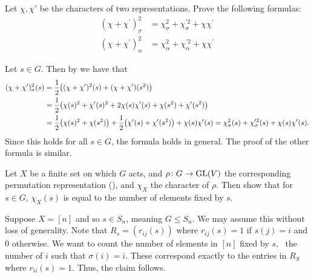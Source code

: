 \documentclass[letterpaper, 11pt, oneside]{book}
\begin{document}
\begin{exercise}
  Let $\chi, \chi'$ be the characters of two representations.
  Prove the following formulas:
  \begin{align*}
    (\chi + \chi^{\prime})^{2}_{\sigma} &= \chi_{\sigma}^{2} + \chi_{\sigma}^{\prime 2} + \chi \chi^{\prime} \\
    (\chi + \chi^{\prime})^{2}_{\alpha} &= \chi_{\alpha}^{2} + \chi_{\alpha}^{\prime 2} + \chi \chi^{\prime}
  \end{align*}
\end{exercise}
\begin{pf}
  Let $s \in G$.
  Then by  we have that
  \begin{align*}
    (\chi + \chi^{\prime})^{2}_{\sigma}(s) &= \frac{1}{2}\pqty{(\chi + \chi^{\prime})^{2}(s) + (\chi + \chi^{\prime})(s^{2})} \\
                                           &= \frac{1}{2}\pqty{\chi(s)^{2} + \chi'(s)^{2} + 2\chi(s)\chi'(s) + \chi(s^{2}) + \chi'(s^{2})} \\
                                           &= \frac{1}{2}\pqty{\chi(s)^{2} + \chi(s^{2})} + \frac{1}{2}\pqty{\chi'(s) + \chi'(s^{2})} + \chi(s)\chi'(s) = \chi^{2}_{\sigma}(s) + \chi^{\prime 2}_{\sigma}(s) + \chi(s) \chi'(s).
  \end{align*}
  Since this holds for all $s \in G$, the formula holds in general.
  The proof of the other formula is similar.
\end{pf}

\begin{exercise}\label{er:Serre_2_2}
  Let $X$ be a finite set on which $G$ acts, and $\rho\colon G \to \operatorname{GL}(V)$ the corresponding permutation representation (), and $\chi_{X}$ the character of $\rho$.
  Then show that for $s \in G$, $\chi_{X}(s)$ is equal to the number of elements fixed by $s$.
\end{exercise}
\begin{pf}
  Suppose $X = [n]$ and so $s \in S_{n}$, meaning $G \leq S_{n}$.
  We may assume this without loss of generality.
  Note that $R_{s} = (r_{ij}(s))$ where $r_{ij}(s) = 1$ if $s(j) = i$ and $0$ otherwise.
  We want to count the number of elements in $[n]$ fixed by $s$, \ie\ the number of $i$ such that $\sigma(i) = i$.
  These correspond exactly to the entries in $R_{S}$ where $r_{ii}(s) = 1$.
  Thus, the claim follows.
\end{pf}
\end{document}
